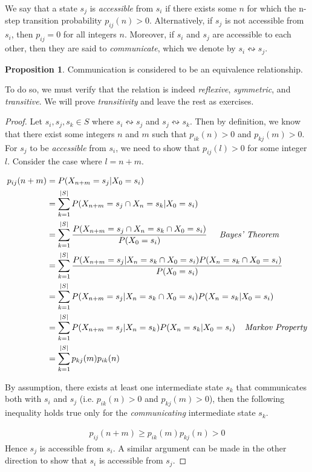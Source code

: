 \documentclass[a4paper,12pt]{article}
\theoremstyle{definition}
\newtheorem{proposition}{Proposition}
\begin{document}
	We say that a state $s_j$ is \emph{accessible} from $s_i$ if there exists some $n$ for which the n-step transition probability $p_{ij}(n) > 0$.
	Alternatively, if $s_j$ is not accessible from $s_i$, then $p_{ij} = 0$ for all integers $n$. Moreover, if $s_i$ and $s_j$ 
	are accessible to each other, then they are said to \emph{communicate}, which we denote by $s_i \leftrightsquigarrow s_j$.
	\begin{proposition}
		Communication is considered to be an equivalence relationship.
	\end{proposition}
	To do so, we must verify that the relation is indeed \emph{reflexive}, \emph{symmetric}, and \emph{transitive}. 
	We will prove \emph{transitivity} and leave the rest as exercises. 
		\begin{proof}	
		Let $s_i, s_j, s_k \in S$ where $s_i \leftrightsquigarrow s_j$ and $s_j \leftrightsquigarrow s_k$.
		Then by definition, we know that there exist some integers $n$ and $m$ such that 
		$p_{ik}(n) > 0$ and $p_{kj}(m) > 0$. For $s_j$ to be \emph{accessible} from $s_i$, we need to show that 
		$p_{ij}(l) > 0$ for some integer $l$. Consider the case where $l = n+m$.

	\begin{equation*}
		\begin{aligned}
			p_{ij}(n+m) &= P(X_{n+m} = s_j | X_0 = s_i) \\
						&= \sum_{k=1}^{|S|} P(X_{n+m} = s_j \cap X_n = s_k | X_0 = s_i) \\
						&= \sum_{k=1}^{|S|} \frac{P(X_{n+m} = s_j \cap X_n = s_k \cap X_0 = s_i)}{P(X_0 = s_i)}\ \;\;\;\; \emph{Bayes' Theorem} \\
						&= \sum_{k=1}^{|S|} \frac{P(X_{n+m} = s_j | X_n = s_k \cap X_0 = s_i)P(X_n = s_k \cap X_0 = s_i)}{P(X_0 = s_i)}\ \\
						&= \sum_{k=1}^{|S|} P(X_{n+m} = s_j | X_n = s_k \cap X_0 = s_i)P(X_n = s_k | X_0 = s_i) \\
						&= \sum_{k=1}^{|S|} P(X_{n+m} = s_j | X_n = s_k)P(X_n = s_k | X_0 = s_i) \;\;\;\; \emph{Markov Property} \\ 
						&= \sum_{k=1}^{|S|} p_{kj}(m)p_{ik}(n) \\
		\end{aligned}
	\end{equation*}	
	
	By assumption, there exists at least one intermediate state $s_k$ that communicates both with $s_i$ and $s_j$ (i.e. $p_{ik}(n) > 0$ 
	and $p_{kj}(m) > 0$), then the following inequality holds true only for the \emph{communicating} intermediate state $s_k$.

	\begin{equation*}
	\begin{aligned}
		 p_{ij}(n+m) \geq p_{ik}(m)p_{kj}(n) > 0
	\end{aligned}
	\end{equation*}	
	Hence $s_j$ is accessible from $s_i$. A similar argument can be made in the other direction to show that $s_i$ is accessible from $s_j$.
	\end{proof}
\end{document}
